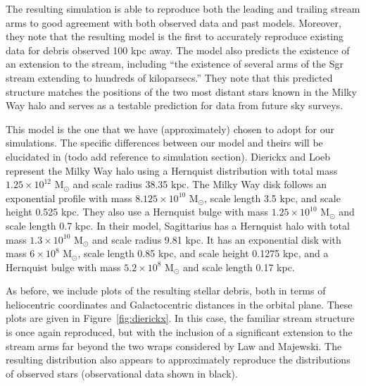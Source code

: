 The resulting simulation is able to reproduce both the leading and trailing
stream arms to good agreement with both observed data and past models.
Moreover, they note that the resulting model is the first to accurately
reproduce existing data for debris observed 100 kpc away. The model also
predicts the existence of an extension to the stream, including ``the
existence of several arms of the Sgr stream extending to hundreds of
kiloparsecs.'' They note that this predicted structure matches the positions
of the two most distant stars known in the Milky Way halo and serves as a
testable prediction for data from future sky surveys.

This model is the one that we have (approximately) chosen to adopt for our
simulations. The specific differences between our model and theirs will be
elucidated in (todo add reference to simulation section). Dierickx and Loeb
represent the Milky Way halo using a Hernquist distribution with total mass
\(1.25 \times 10^{12}\) M\(_\odot\) and scale radius 38.35 kpc. The Milky Way
disk follows an exponential profile with mass \(8.125 \times 10^{10}\)
M\(_\odot\), scale length 3.5 kpc, and scale height 0.525 kpc. They also use a
Hernquist bulge with mass \(1.25 \times 10^{10}\) M\(_\odot\) and scale length
0.7 kpc. In their model, Sagittarius has a Hernquist halo with total mass
\(1.3 \times 10^{10}\) M\(_\odot\) and scale radius 9.81 kpc. It has an
exponential disk with mass \(6 \times 10^{8}\) M\(_\odot\), scale length 0.85
kpc, and scale height 0.1275 kpc, and a Hernquist bulge with mass \(5.2 \times
10^{8}\) M\(_\odot\) and scale length 0.17 kpc.

As before, we include plots of the resulting stellar debris, both in terms of
heliocentric coordinates and Galactocentric distances in the orbital plane.
These plots are given in Figure~\ref{fig:dierickx}. In this case, the familiar
stream structure is once again reproduced, but with the inclusion of a
significant extension to the stream arms far beyond the two wraps considered
by Law and Majewski. The resulting distribution also appears to approximately
reproduce the distributions of observed stars (observational data shown in
black).

